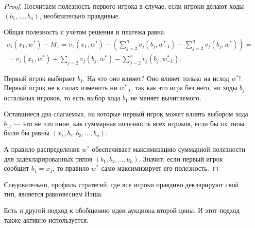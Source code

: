 \begin{proof}
Посчитаем полезность первого игрока в случае, если игроки делают ходы $ (b_{1},\ldots,b_{n}) $, необязательно правдивые.

Общая полезность с учётом решения и платежа равна:
\begin{multline}
v_{1}(x_{1},w^{*})-M_{1}=v_{1}(x_{1},w^{*})-\left(\sum_{j=2}^{n}v_{j}(b_{j},w_{-1}^{*})-\sum_{j=2}^{n}v_{j}(b_{j},w^{*})\right)=\\
=v_{1}(x_{1},w^{*})+\sum_{j=2}v_{j}(b_{j},w^{*})-\sum_{j=2}^{n}v_{j}(b_{j},w_{-1}^{*}).
\end{multline}

Первый игрок выбирает $ b_{1} $. На что оно влияет? Оно влияет только на исход $ w^{*} $! Первый игрок не в силах изменить ни  $ w_{-1}^{*} $, так как это игра без него, ни ходы $ b_{j} $ остальных игроков, то есть выбор хода $ b_{1} $ не меняет вычитаемого.

Оставшиеся два слагаемых, на которые первый игрок может влиять выбором хода $ b_{1} $, — это не что иное, как суммарная полезность всех игроков, если бы их типы были бы равны $ (x_{1},b_{2},b_{3},\ldots,b_{n}) $.

А правило распределения $ w^{*} $ обеспечивает максимизацию суммарной полезности для задекларированных типов $ (b_{1},b_{2},\ldots,b_{n}) $. Значит, если первый игрок сообщит $ b_{1}=x_{1} $, то правило $ w^{*} $ само максимизирует его полезность.

\end{proof}

Следовательно, профиль стратегий, где все игроки правдиво декларируют свой тип, является равновесием Нэша.







Есть и другой подход к обобщению идеи аукциона второй цены. И этот подход также активно используется.

